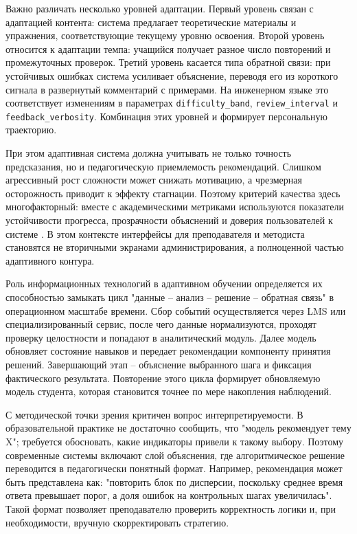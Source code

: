 Важно различать несколько уровней адаптации. Первый уровень связан с адаптацией
контента: система предлагает теоретические материалы и упражнения,
соответствующие текущему уровню освоения. Второй уровень относится к адаптации
темпа: учащийся получает разное число повторений и промежуточных проверок.
Третий уровень касается типа обратной связи: при устойчивых ошибках система
усиливает объяснение, переводя его из короткого сигнала в развернутый
комментарий с примерами. На инженерном языке это соответствует изменениям в
параметрах \texttt{difficulty\_band}, \texttt{review\_interval} и
\texttt{feedback\_verbosity}. Комбинация этих уровней и формирует персональную
траекторию.

При этом адаптивная система должна учитывать не только точность предсказания,
но и педагогическую приемлемость рекомендаций. Слишком агрессивный рост
сложности может снижать мотивацию, а чрезмерная осторожность приводит к эффекту
стагнации. Поэтому критерий качества здесь многофакторный: вместе с
академическими метриками используются показатели устойчивости прогресса,
прозрачности объяснений и доверия пользователей к системе
\autocite{dumont2023personalized,ivanov2025edtech}. В этом контексте интерфейсы
для преподавателя и методиста становятся не вторичными экранами
администрирования, а полноценной частью адаптивного контура.

Роль информационных технологий в адаптивном обучении определяется их
способностью замыкать цикл "данные -- анализ -- решение -- обратная связь" в
операционном масштабе времени. Сбор событий осуществляется через LMS или
специализированный сервис, после чего данные нормализуются, проходят проверку
целостности и попадают в аналитический модуль. Далее модель обновляет состояние
навыков и передает рекомендации компоненту принятия решений. Завершающий этап
-- объяснение выбранного шага и фиксация фактического результата. Повторение
этого цикла формирует обновляемую модель студента, которая становится точнее по
мере накопления наблюдений.

С методической точки зрения критичен вопрос интерпретируемости. В
образовательной практике не достаточно сообщить, что "модель рекомендует тему
X"; требуется обосновать, какие индикаторы привели к такому выбору. Поэтому
современные системы включают слой объяснения, где алгоритмическое решение
переводится в педагогически понятный формат. Например, рекомендация может быть
представлена как: "повторить блок по дисперсии, поскольку среднее время ответа
превышает порог, а доля ошибок на контрольных шагах увеличилась". Такой формат
позволяет преподавателю проверить корректность логики и, при необходимости,
вручную скорректировать стратегию.

